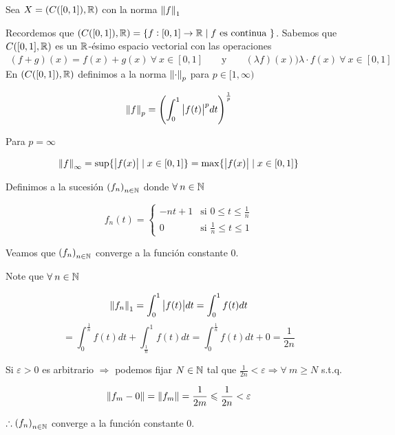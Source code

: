 \begin{eg}
    Sea $X = (C([0,1]), \mathbb{R})$ con la norma $\norm{f}_1$

    Recordemos que $(C([0,1]), \mathbb{R}) = \{ f : [0,1] \to \mathbb{R} \mid f \text{ es continua } \}$. Sabemos que $C([0,1], \mathbb{R})$ es un $\mathbb{R}$-ésimo espacio vectorial con las operaciones
    \begin{align*}
       (f+g)(x) = f(x)+ g(x) \: \forall \: x \in [0,1] && \text{ y } && (\lambda f)(x) ) \lambda \cdot f(x) \: \forall \: x \in [0,1] 
    \end{align*}
    En $ (C([0,1]), \mathbb{R})$ definimos a la norma $\norm{\cdot}_p$ para $p \in [1,\infty)$

    $${\norm{f}}_{p} = {\left( \int_{0}^{1} {\abs{f(t)}}^{p} dt \right)}^{\frac{1}{p}}$$

    Para $p = \infty$

    $${\norm{f}}_{\infty} = \sup \{ \abs{f(x)} \mid x \in [0,1] \} = \max \{ \abs{f(x)} \mid x \in [0,1] \}$$

    Definimos a la sucesión ${(f_n)}_{n \in \mathbb{N}}$ donde $\forall \: n \in \mathbb{N}$

     $$ f_n(t) = \begin{cases}
              -nt+1 & \text{si }  0 \leqslant t \leqslant \frac{1}{n}\\
              0 & \text{si } \frac{1}{n} \leqslant t \leqslant 1
     \end{cases}$$

     Veamos que ${(f_n)}_{n \in \mathbb{N}}$ converge a la función constante 0. 
\end{eg}

\begin{proofexplanation}
    Note que $\forall \: n \in \mathbb{N}$

    
    $${\norm{f_n}}_{1} =  \int_{0}^{1} \abs{f(t)} dt = \int_{0}^{1} f(t) dt$$
    $$= \int_{0}^{\frac{1}{n}} f(t) dt + \int_{\frac{1}{n}}^{1} f(t) dt = \int_{0}^{\frac{1}{n}} f(t) dt + 0 = \frac{1}{2n}$$

    Si $\varepsilon > 0$ es arbitrario $\Rightarrow$ podemos fijar $N \in \mathbb{N}$ tal que $\frac{1}{2n} < \varepsilon \Rightarrow \forall \: m \geqslant N$ s.t.q.

    $$\norm{f_m-0} = \norm{f_m} = \frac{1}{2m} \leqslant \frac{1}{2n} < \varepsilon$$

    $\therefore {(f_n)}_{n \in \mathbb{N}}$ converge a la función constante 0. 
\end{proofexplanation}

